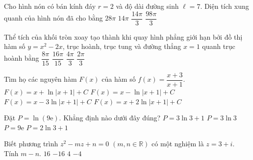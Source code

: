 \begin{ex}[BỎ]
	Cho hình nón có bán kính đáy $r=2$ và độ dài đường sinh $\ell=7$. Diện tích xung quanh của hình nón đã cho bằng
	\choice
	{$28\pi$}
	{\True $14\pi$}
	{$\dfrac{14\pi}{3}$}
	{$\dfrac{98\pi}{3}$}
\end{ex}

\begin{ex}%
	Thể tích của khối tròn xoay tạo thành khi quay hình phẳng giới hạn bởi đồ thị hàm số $y=x^2-2x$, trục hoành, trục tung và đường thẳng $x=1$ quanh trục hoành bằng
	\choice
	{\True $\dfrac{8 \pi}{15}$}
	{$\dfrac{16 \pi}{15}$}
	{$\dfrac{4 \pi}{3}$}
	{$\dfrac{2 \pi}{3}$}
\end{ex}

\begin{ex}%
	Tìm họ các nguyên hàm $F(x)$ của hàm số $f(x)=\dfrac{x+3}{x+1}$.
	\choice
	{$F(x)=x+\ln|x+1|+C$}
	{$F(x)=x-\ln|x+1|+C$}
	{$F(x)=x-3\ln|x+1|+C$}
	{\True $F(x)=x+2\ln|x+1|+C$}
\end{ex}

\begin{ex}%
	Đặt $P=\ln(9\mathrm{e})$. Khẳng định nào dưới đây đúng?
	\choice
	{$P=3\ln3+1$}
	{$P=3\ln3$}
	{$P=9\mathrm{e}$}
	{\True $P=2\ln3+1$}
\end{ex}

\begin{ex}[BỎ]
	Biết phương trình $z^2-mz+n=0$ $(m, n \in \mathbb{R})$ có một nghiệm là $z=3+i$. Tính $m-n$.
	\choice
	{$16$}
	{$-16$}
	{$4$}
	{\True  $-4$ }
\end{ex}

